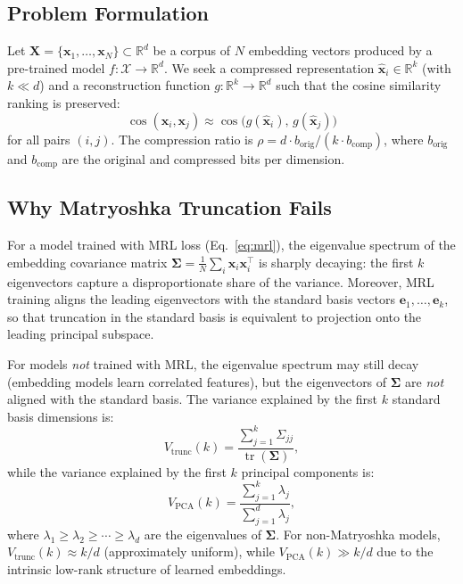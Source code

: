 \documentclass[journal]{IEEEtran}
\newcommand{\R}{\mathbb{R}}
\newcommand{\cossim}{\operatorname{cos}}
\newcommand{\tr}{\operatorname{tr}}
\begin{document}
\subsection{Problem Formulation}

Let $\mathbf{X} = \{\mathbf{x}_1, \ldots, \mathbf{x}_N\} \subset \R^d$ be a corpus of $N$ embedding vectors produced by a pre-trained model $f: \mathcal{X} \rightarrow \R^d$.
We seek a compressed representation $\hat{\mathbf{x}}_i \in \R^k$ (with $k \ll d$) and a reconstruction function $g: \R^k \rightarrow \R^d$ such that the cosine similarity ranking is preserved:
\begin{equation}
  \cossim(\mathbf{x}_i, \mathbf{x}_j) \approx \cossim\bigl(g(\hat{\mathbf{x}}_i),\, g(\hat{\mathbf{x}}_j)\bigr)
  \label{eq:objective}
\end{equation}
for all pairs $(i, j)$.
The compression ratio is $\rho = d \cdot b_{\text{orig}} / (k \cdot b_{\text{comp}})$, where $b_{\text{orig}}$ and $b_{\text{comp}}$ are the original and compressed bits per dimension.

\subsection{Why Matryoshka Truncation Fails}
\label{sec:why_fails}

For a model trained with MRL loss (Eq.~\ref{eq:mrl}), the eigenvalue spectrum of the embedding covariance matrix $\mathbf{\Sigma} = \frac{1}{N}\sum_i \mathbf{x}_i \mathbf{x}_i^\top$ is sharply decaying: the first $k$ eigenvectors capture a disproportionate share of the variance.
Moreover, MRL training aligns the leading eigenvectors with the standard basis vectors $\mathbf{e}_1, \ldots, \mathbf{e}_k$, so that truncation in the standard basis is equivalent to projection onto the leading principal subspace.

For models \emph{not} trained with MRL, the eigenvalue spectrum may still decay (embedding models learn correlated features), but the eigenvectors of $\mathbf{\Sigma}$ are \emph{not} aligned with the standard basis.
The variance explained by the first $k$ standard basis dimensions is:
\begin{equation}
  V_{\text{trunc}}(k) = \frac{\sum_{j=1}^{k} \Sigma_{jj}}{\tr(\mathbf{\Sigma})},
  \label{eq:trunc_var}
\end{equation}
while the variance explained by the first $k$ principal components is:
\begin{equation}
  V_{\text{PCA}}(k) = \frac{\sum_{j=1}^{k} \lambda_j}{\sum_{j=1}^{d} \lambda_j},
  \label{eq:pca_var}
\end{equation}
where $\lambda_1 \geq \lambda_2 \geq \cdots \geq \lambda_d$ are the eigenvalues of $\mathbf{\Sigma}$.
For non-Matryoshka models, $V_{\text{trunc}}(k) \approx k/d$ (approximately uniform), while $V_{\text{PCA}}(k) \gg k/d$ due to the intrinsic low-rank structure of learned embeddings.
\end{document}
